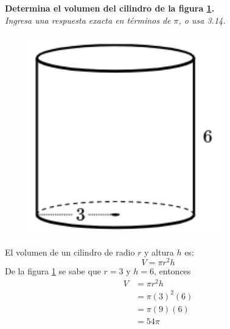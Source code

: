 \textbf{Determina el volumen del cilindro de la figura \ref{fig:vol_cil_07}.}\\
\textit{Ingresa una respuesta exacta en términos de $\pi$, o usa 3.14.}\\

\begin{minipage}[t]{0.3\linewidth}
    \begin{figure}[H]
        \centering
        \includegraphics[width=0.75\textwidth]{../images/vol_cil_07.png}
        \caption{}
        \label{fig:vol_cil_07}
    \end{figure}
\end{minipage}%
\begin{minipage}[t]{0.7\linewidth}
    \begin{solutionbox}{5cm}        El volumen de un cilindro de radio $r$ y altura $h$ es:
        \begin{equation*}
            V = \pi r^2 h
        \end{equation*}
        De la figura \ref{fig:vol_cil_07} se sabe que $r=3$ y $h=6$, entonces
        \begin{equation*}
            \begin{split}
                V & = \pi r^2 h\\
                & = \pi (3)^2 (6)\\
                & = \pi (9) (6)\\
                & = 54\pi
            \end{split}
        \end{equation*}
    \end{solutionbox}
\end{minipage}%